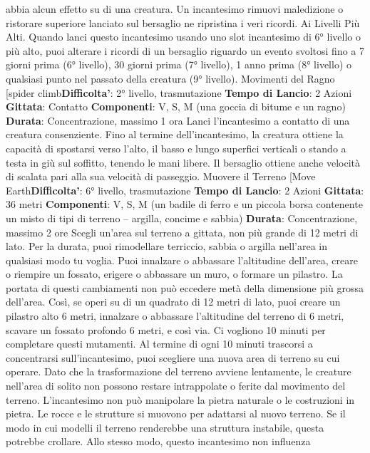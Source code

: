 \begin{multicols}{2}
abbia alcun effetto su di una creatura.
Un incantesimo rimuovi maledizione o ristorare
superiore lanciato sul bersaglio ne ripristina i veri
ricordi.
Ai Livelli Più Alti. Quando lanci questo incantesimo
usando uno slot incantesimo di 6° livello o più alto, puoi
alterare i ricordi di un bersaglio riguardo un evento
svoltosi fino a 7 giorni prima (6° livello), 30 giorni prima
(7° livello), 1 anno prima (8° livello) o qualsiasi punto
nel passato della creatura (9° livello).
Movimenti del Ragno
[spider climb\textbf{Difficolta'}:
2° livello, trasmutazione
\textbf{Tempo di Lancio}: 2 Azioni
\textbf{Gittata}: Contatto
\textbf{Componenti}: V, S, M (una goccia di bitume e un
ragno)
\textbf{Durata}: Concentrazione, massimo 1 ora
Lanci l’incantesimo a contatto di una creatura
consenziente. Fino al termine dell’incantesimo, la
creatura ottiene la capacità di spostarsi verso l’alto, il
basso e lungo superfici verticali o stando a testa in giù
sul soffitto, tenendo le mani libere. Il bersaglio ottiene
anche velocità di scalata pari alla sua velocità di
passeggio.
Muovere il Terreno
[Move Earth\textbf{Difficolta'}:
6° livello, trasmutazione
\textbf{Tempo di Lancio}: 2 Azioni
\textbf{Gittata}: 36 metri
\textbf{Componenti}: V, S, M (un badile di ferro e un piccola
borsa contenente un misto di tipi di terreno – argilla,
concime e sabbia)
\textbf{Durata}: Concentrazione, massimo 2 ore
Scegli un’area sul terreno a gittata, non più grande di
12 metri di lato. Per la durata, puoi rimodellare terriccio,
sabbia o argilla nell’area in qualsiasi modo tu voglia.
Puoi innalzare o abbassare l’altitudine dell’area, creare
o riempire un fossato, erigere o abbassare un muro, o
formare un pilastro. La portata di questi cambiamenti
non può eccedere metà della dimensione più grossa
dell’area. Così, se operi su di un quadrato di 12 metri di
lato, puoi creare un pilastro alto 6 metri, innalzare o
abbassare l’altitudine del terreno di 6 metri, scavare un
fossato profondo 6 metri, e così via. Ci vogliono 10
minuti per completare questi mutamenti.
Al termine di ogni 10 minuti trascorsi a concentrarsi
sull’incantesimo, puoi scegliere una nuova area di
terreno su cui operare.
Dato che la trasformazione del terreno avviene
lentamente, le creature nell’area di solito non possono
restare intrappolate o ferite dal movimento del terreno.
L’incantesimo non può manipolare la pietra naturale o
le costruzioni in pietra. Le rocce e le strutture si
muovono per adattarsi al nuovo terreno. Se il modo in
cui modelli il terreno renderebbe una struttura instabile,
questa potrebbe crollare.
Allo stesso modo, questo incantesimo non influenza

\end{multicols}
